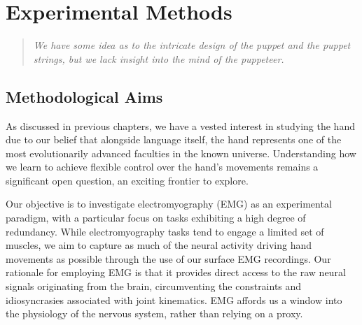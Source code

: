 \documentclass[../main.tex]{subfiles}
\begin{document}
\chapter{Experimental Methods}\label{chap:methods}

\bigskip
\begin{quote}
    \emph{We have some idea as to the intricate design of the puppet and the puppet strings, but we lack insight into the mind of the puppeteer\cite{bizziHardScientificQuest2015}.}\\
\end{quote}

\cleardoublepage%


\section{Methodological Aims}\label{sec:methods_aims}

As discussed in previous chapters, we have a vested interest in studying the hand due to our belief that alongside language itself, the hand represents one of the most evolutionarily advanced faculties in the known universe. Understanding how we learn to achieve flexible control over the hand's movements remains a significant open question, an exciting frontier to explore.

Our objective is to investigate electromyography (EMG) as an experimental paradigm, with a particular focus on tasks exhibiting a high degree of redundancy. While electromyography tasks tend to engage a limited set of muscles, we aim to capture as much of the neural activity driving hand movements as possible through the use of our surface EMG recordings. Our rationale for employing EMG is that it provides direct access to the raw neural signals originating from the brain, circumventing the constraints and idiosyncrasies associated with joint kinematics. EMG affords us a window into the physiology of the nervous system, rather than relying on a proxy.
\end{document}
